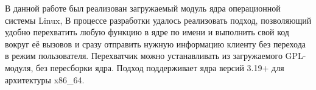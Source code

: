 \Conclusion %

В данной работе был реализован загружаемый модуль ядра операционной системы Linux, В процессе разработки удалось реализовать подход, позволяющий удобно перехватить любую функцию в ядре по имени и выполнить свой код вокруг её вызовов и сразу отправить нужную информацию клиенту без перехода в режим пользователя. Перехватчик можно устанавливать из загружаемого GPL-модуля, без пересборки ядра. Подход поддерживает ядра версий 3.19+ для архитектуры x86\_64.


